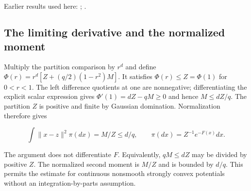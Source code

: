 \documentclass[11pt,a4paper]{report}
\begin{document}
Earlier results used here: \cite[Section~3.49.2]{LangevinLean2026ULASC}; \cite[Section~3.49.3]{LangevinLean2026ULASC}.
\subsection{\texorpdfstring{The limiting derivative and the normalized moment}{The limiting derivative and the normalized moment}}
\label{report-step-ProximalLangevin-SharpConcentration-lean-2}


Multiply the partition comparison by \(r^d\) and define \(\Phi(r)=r^d[Z+(q/2)(1-r^2)M]\). It satisfies \(\Phi(r)\le Z=\Phi(1)\) for \(0<r<1\). The left difference quotients at one are nonnegative; differentiating the explicit scalar expression gives \(\Phi'(1)=dZ-qM\ge0\) and hence \(M\le dZ/q\). The partition \(Z\) is positive and finite by Gaussian domination. Normalization therefore gives

\[\int\|x-z\|^2\pi(dx)=M/Z\le d/q,\qquad\pi(dx)=Z^{-1}e^{-F(x)}dx.\]

The argument does not differentiate \(F\). Equivalently, \(qM\le dZ\) may be divided by positive \(Z\). The normalized second moment is \(M/Z\) and is bounded by \(d/q\). This permits the estimate for continuous nonsmooth strongly convex potentials without an integration-by-parts assumption.
\end{document}
